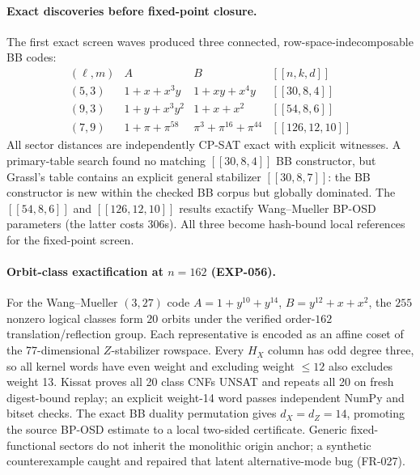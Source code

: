 \documentclass[11pt]{article}
\theoremstyle{plain}
\theoremstyle{remark}
\begin{document}
\paragraph{Exact discoveries before fixed-point closure.} The first exact
screen waves produced three connected, row-space-indecomposable BB codes:
\[
\begin{array}{c|c|c|c}
(\ell,m)&A&B&[[n,k,d]]\\\hline
(5,3)&1+x+x^3y&1+xy+x^4y&[[30,8,4]]\\
(9,3)&1+y+x^3y^2&1+x+x^2&[[54,8,6]]\\
(7,9)&1+\pi+\pi^{58}&\pi^3+\pi^{16}+\pi^{44}&[[126,12,10]]
\end{array}
\]
All sector distances are independently CP-SAT exact with explicit witnesses.
A primary-table search found no matching $[[30,8,4]]$ BB constructor, but
Grassl's table contains an explicit general stabilizer $[[30,8,7]]$: the BB
constructor is new within the checked BB corpus but globally dominated. The
$[[54,8,6]]$ and $[[126,12,10]]$ results exactify Wang--Mueller BP-OSD
parameters (the latter costs 306s). All three become hash-bound local
references for the fixed-point screen.

\paragraph{Orbit-class exactification at $n=162$ (EXP-056).}
For the Wang--Mueller $(3,27)$ code
$A=1+y^{10}+y^{14}$, $B=y^{12}+x+x^2$, the $255$ nonzero logical
classes form $20$ orbits under the verified order-$162$
translation/reflection group. Each representative is encoded as an affine
coset of the 77-dimensional $Z$-stabilizer rowspace. Every $H_X$ column has
odd degree three, so all kernel words have even weight and excluding weight
$\le12$ also excludes weight 13. Kissat proves all 20 class CNFs UNSAT and
repeats all 20 on fresh digest-bound replay; an explicit weight-14 word passes
independent NumPy and bitset checks. The exact BB duality permutation gives
$d_X=d_Z=14$, promoting the source BP-OSD estimate to a local two-sided
certificate. Generic fixed-functional sectors do not inherit the monolithic
origin anchor; a synthetic counterexample caught and repaired that latent
alternative-mode bug (FR-027).
\end{document}
